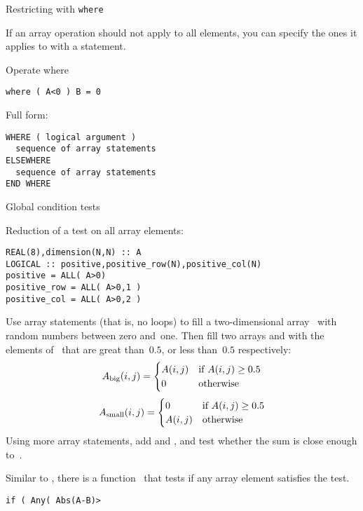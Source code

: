  {Restricting with \tt{where}}

If an array operation should not apply to all elements, you can
specify the ones it applies to with a  statement.

\begin{block}{Operate where}
  \label{sl:farray-where}
\begin{lstlisting}
where ( A<0 ) B = 0
\end{lstlisting}

Full form:
\begin{lstlisting}
WHERE ( logical argument )
  sequence of array statements
ELSEWHERE
  sequence of array statements
END WHERE
\end{lstlisting}
\end{block}

 {Global condition tests}

Reduction of a test on all array elements:
\begin{lstlisting}
REAL(8),dimension(N,N) :: A
LOGICAL :: positive,positive_row(N),positive_col(N)
positive = ALL( A>0)
positive_row = ALL( A>0,1 )
positive_col = ALL( A>0,2 )
\end{lstlisting}

\begin{exercise}
  Use array statements (that is, no loops) to fill a two-dimensional
  array~ with random numbers between zero and~one. Then fill two
  arrays  and  with the elements of~ that are
  great than~$0.5$, or less than~$0.5$ respectively:
  \[ A_{\scriptstyle\mathrm{big}}(i,j) =
  \begin{cases}
    A(i,j)&\hbox{if $A(i,j)\geq 0.5$}\\ 0&\hbox{otherwise}
  \end{cases}
  \]
  \[ A_{\scriptstyle\mathrm{small}}(i,j) =
  \begin{cases}
    0&\hbox{if $A(i,j)\geq 0.5$}\\ A(i,j)&\hbox{otherwise}
  \end{cases}
  \]
  Using more array statements, add  and , and test
  whether the sum is close enough to~.
\end{exercise}

Similar to , there is a function~ that tests
if any array element satisfies the test.
\begin{lstlisting}
if ( Any( Abs(A-B)>
\end{lstlisting}

